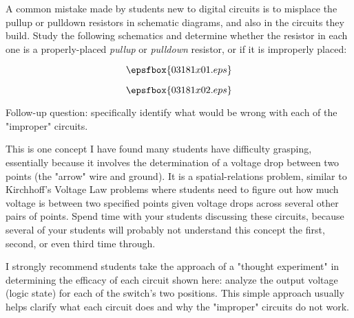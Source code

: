 

A common mistake made by students new to digital circuits is to misplace the pullup or pulldown resistors in schematic diagrams, and also in the circuits they build.  Study the following schematics and determine whether the resistor in each one is a properly-placed {\it pullup} or {\it pulldown} resistor, or if it is improperly placed:

$$\epsfbox{03181x01.eps}$$







$$\epsfbox{03181x02.eps}$$

\vskip 10pt

Follow-up question: specifically identify what would be wrong with each of the "improper" circuits.







This is one concept I have found many students have difficulty grasping, essentially because it involves the determination of a voltage drop between two points (the "arrow" wire and ground).  It is a spatial-relations problem, similar to Kirchhoff's Voltage Law problems where students need to figure out how much voltage is between two specified points given voltage drops across several other pairs of points.  Spend time with your students discussing these circuits, because several of your students will probably not understand this concept the first, second, or even third time through.

I strongly recommend students take the approach of a "thought experiment" in determining the efficacy of each circuit shown here: analyze the output voltage (logic state) for each of the switch's two positions.  This simple approach usually helps clarify what each circuit does and why the "improper" circuits do not work.




